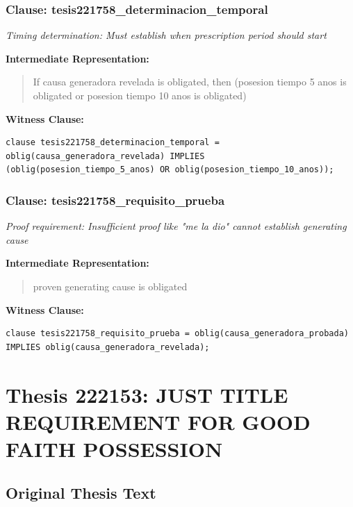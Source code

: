 \documentclass[11pt,a4paper]{article}
\begin{document}
\subsubsection{Clause: tesis221758\_determinacion\_temporal}

\textit{Timing determination: Must establish when prescription period should start}

\textbf{Intermediate Representation:}

\begin{quote}
If causa generadora revelada is obligated, then (posesion tiempo 5 anos is obligated or posesion tiempo 10 anos is obligated)
\end{quote}

\textbf{Witness Clause:}

\begin{lstlisting}[style=witnessstyle, language=Witness]
clause tesis221758_determinacion_temporal = oblig(causa_generadora_revelada) IMPLIES (oblig(posesion_tiempo_5_anos) OR oblig(posesion_tiempo_10_anos));
\end{lstlisting}

\subsubsection{Clause: tesis221758\_requisito\_prueba}

\textit{Proof requirement: Insufficient proof like "me la dio" cannot establish generating cause}

\textbf{Intermediate Representation:}

\begin{quote}
proven generating cause is obligated
\end{quote}

\textbf{Witness Clause:}

\begin{lstlisting}[style=witnessstyle, language=Witness]
clause tesis221758_requisito_prueba = oblig(causa_generadora_probada) IMPLIES oblig(causa_generadora_revelada);
\end{lstlisting}

\newpage

\section{Thesis 222153: JUST TITLE REQUIREMENT FOR GOOD FAITH POSSESSION}
\label{thesis:222153}

\subsection{Original Thesis Text}
\end{document}

